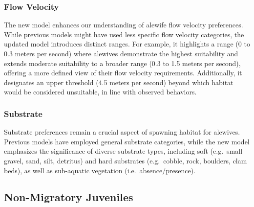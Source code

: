 \documentclass[
]{book}
\begin{document}
\hypertarget{flow-velocity-3}{%
\subsubsection{Flow Velocity}\label{flow-velocity-3}}

The new model enhances our understanding of alewife flow velocity preferences.
While previous models might have used less specific flow velocity categories, the updated model introduces distinct ranges.
For example, it highlights a range (0 to 0.3 meters per second) where alewives demonstrate the highest suitability and extends moderate suitability to a broader range (0.3 to 1.5 meters per second), offering a more defined view of their flow velocity requirements.
Additionally, it designates an upper threshold (4.5 meters per second) beyond which habitat would be considered unsuitable, in line with observed behaviors.

\hypertarget{substrate-3}{%
\subsubsection{Substrate}\label{substrate-3}}

Substrate preferences remain a crucial aspect of spawning habitat for alewives.
Previous models have employed general substrate categories, while the new model emphasizes the significance of diverse substrate types, including soft (e.g.~small gravel, sand, silt, detritus) and hard substrates (e.g.~cobble, rock, boulders, clam beds), as well as sub-aquatic vegetation (i.e.~absence/presence).

\hypertarget{non-migratory-juveniles-1}{%
\subsection{Non-Migratory Juveniles}\label{non-migratory-juveniles-1}}
\end{document}
